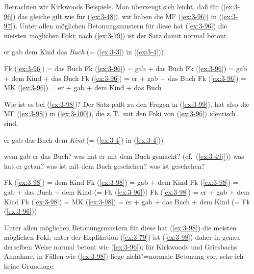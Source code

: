 \documentclass[output=paper]{langsci/langscibook}
\begin{document}
Betrachten wir Kirkwoods Beispiele. Man überzeugt sich leicht, daß für
(\ref{ex:3-96}) das gleiche gilt wie für (\ref{ex:3-48}), \dash wir haben die MF (\ref{ex:3-96}) in
(\ref{ex:3-97}). Unter allen möglichen Betonungsmustern für diese  hat
(\ref{ex:3-96}) die meisten möglichen Foki; nach (\ref{ex:3-79}) ist der Satz damit normal
betont.
\begin{exe}
\ex
\label{ex:3-96}
er gab dem Kind das \textit{Buch} (= (\ref{ex:3-3}) in (\ref{ex:3-4}))
\ex
\label{ex:3-97}
\begin{xlist}
\ex
\label{ex:3-97a}
Fk (\ref{ex:3-96}) = das Buch
\ex
\label{ex:3-97b}
Fk (\ref{ex:3-96}) = gab + das Buch
\ex
\label{ex:3-97c}
Fk (\ref{ex:3-96}) = gab + dem Kind + das Buch
\ex
\label{ex:3-97d}
Fk (\ref{ex:3-96}) = er + gab + das Buch
\ex
\label{ex:3-97e}
Fk (\ref{ex:3-96}) = MK (\ref{ex:3-96}) = er + gab + dem Kind + das Buch
\end{xlist}
\end{exe}
Wie ist es bei (\ref{ex:3-98})? Der Satz paßt zu den Fragen in (\ref{ex:3-99}), hat also die
MF (\ref{ex:3-98}) in (\ref{ex:3-100}), die z.\,T.\ mit den Foki von (\ref{ex:3-96}) identisch sind.
\begin{exe}
\ex
\label{ex:3-98}
er gab das Buch dem \textit{Kind} (= (\ref{ex:3-4}) in (\ref{ex:3-4}))
\ex
\label{ex:3-99}
\begin{xlist}
\ex
\label{ex:3-99a}
wem gab er das Buch?
\ex
\label{ex:3-99b}
was hat er mit dem Buch gemacht? (cf.\ (\ref{ex:3-49j}))
\ex
\label{ex:3-99c}
was hat er getan?
\ex
\label{ex:3-99d}
was ist mit dem Buch geschehen?
\ex
\label{ex:3-99e}
was ist geschehen?
\end{xlist}
\ex
\label{ex:3-100}
\begin{xlist}
\ex
\label{ex:3-100a}
Fk (\ref{ex:3-98}) = dem Kind
\ex
\label{ex:3-100b}
Fk (\ref{ex:3-98}) = gab + dem Kind
\ex
\label{ex:3-100c}
Fk (\ref{ex:3-98}) = gab + das Buch + dem Kind (= Fk (\ref{ex:3-96}))
\ex
\label{ex:3-100d}
Fk (\ref{ex:3-98}) = er + gab + dem Kind
\ex
\label{ex:3-100e}
Fk (\ref{ex:3-98}) = MK (\ref{ex:3-98}) = er + gab + das Buch + dem Kind (= Fk (\ref{ex:3-96}))
\end{xlist}
\end{exe}
Unter allen möglichen Betonungsmustern für diese  hat (\ref{ex:3-98})
die meisten möglichen Foki; unter der Explikation (\ref{ex:3-79}) ist (\ref{ex:3-98}) daher
in genau derselben Weise normal betont wie (\ref{ex:3-96}); für Kirkwoods und
Griesbachs Annahme, in Fällen wie (\ref{ex:3-98}) liege nicht"=normale Betonung
vor, sehe ich keine Grundlage.
\end{document}
